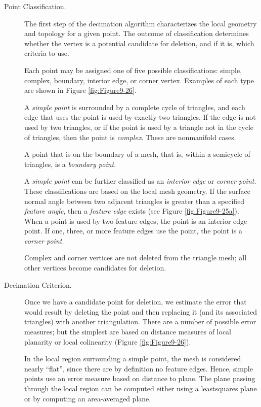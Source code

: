\begin{description}

\item[Point Classification.] The first step of the decimation algorithm characterizes the local geometry and topology for a given point. The outcome of classification determines whether the vertex is a potential candidate for deletion, and if it is, which criteria to use.

Each point may be assigned one of five possible classifications: simple, complex, boundary, interior edge, or corner vertex. Examples of each type are shown in Figure \ref{fig:Figure9-26}.

A \emph{simple point} is surrounded by a complete cycle of triangles, and each edge that uses the point is used by exactly two triangles. If the edge is not used by two triangles, or if the point is used by a triangle not in the cycle of triangles, then the point is \emph{complex}. These are nonmanifold cases.

A point that is on the boundary of a mesh, that is, within a semicycle of triangles, is a \emph{boundary point}.

A \emph{simple point} can be further classified as an \emph{interior edge} or \emph{corner point}. These classifications are based on the local mesh geometry. If the surface normal angle between two adjacent triangles is greater than a specified \emph{feature angle}, then a \emph{feature edge} exists (see Figure \ref{fig:Figure9-25a}). When a point is used by two feature edges, the point is an interior edge point. If one, three, or more feature edges use the point, the point is a \emph{corner point}.

Complex and corner vertices are not deleted from the triangle mesh; all other vertices become candidates for deletion.

\item[Decimation Criterion.] Once we have a candidate point for deletion, we estimate the error that would result by deleting the point and then replacing it (and its associated triangles) with another triangulation. There are a number of possible error measures; but the simplest are based on distance measures of local planarity or local colinearity (Figure \ref{fig:Figure9-26}).

In the local region surrounding a simple point, the mesh is considered nearly ``flat'', since there are by definition no feature edges. Hence, simple points use an error measure based on distance to plane. The plane passing through the local region can be computed either using a leastsquares plane or by computing an area-averaged plane.


\end{description}

